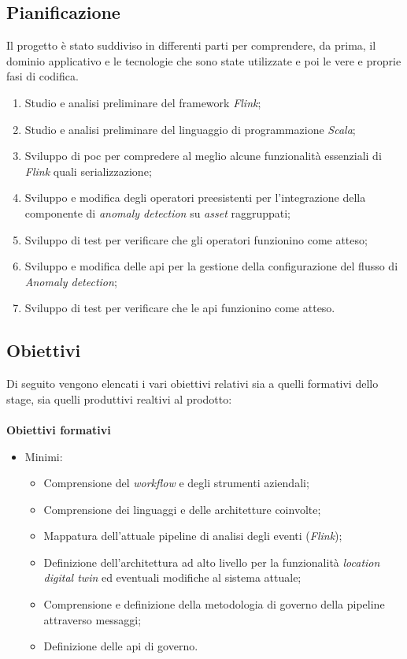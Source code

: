 \subsection{Pianificazione}
Il progetto è stato suddiviso in differenti parti per comprendere, da prima, il dominio applicativo e le tecnologie che sono state utilizzate e poi le vere e proprie fasi di codifica.

\begin{enumerate}
	\item{Studio e analisi preliminare del \gls{framework} \textit{Flink};}
	\item{Studio e analisi preliminare del linguaggio di programmazione \textit{Scala};}
	\item{Sviluppo di \gls{poc} per compredere al meglio alcune funzionalità essenziali di \textit{Flink} quali \gls{serializzazione};}
	\item{Sviluppo e modifica degli operatori preesistenti per l'integrazione della componente di \textit{anomaly detection} su \textit{asset} raggruppati;}
	\item{Sviluppo di test per verificare che gli operatori funzionino come atteso;}
	\item{Sviluppo e modifica delle \gls{api} per la gestione della configurazione del flusso di \textit{Anomaly detection};}
	\item{Sviluppo di test per verificare che le \gls{api} funzionino come atteso.}
\end{enumerate}

\subsection{Obiettivi}
Di seguito vengono elencati i vari obiettivi relativi sia a quelli formativi dello stage, sia quelli produttivi realtivi al prodotto:
\\ \\
\textbf{Obiettivi formativi}
\begin{itemize}
	\item{Minimi:
		\begin{itemize}
			\item{Comprensione del \textit{workflow} e degli strumenti aziendali;}
			\item{Comprensione dei linguaggi e delle architetture coinvolte;}
			\item{Mappatura dell’attuale \gls{pipeline} di analisi degli eventi (\textit{Flink});}
			\item{Definizione dell’architettura ad alto livello per la funzionalità \textit{location digital twin} ed eventuali modifiche al sistema attuale;}
			\item{Comprensione e definizione della metodologia di governo della \gls{pipeline} attraverso messaggi;}
			\item{Definizione delle \gls{api} di governo.}
		\end{itemize}			
	}
\end{itemize}

